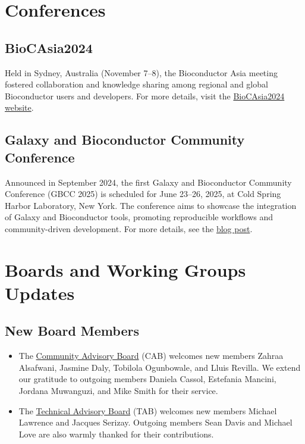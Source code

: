 \hypertarget{conferences}{%
\section{Conferences}\label{conferences}}

\hypertarget{biocasia2024}{%
\subsection{BioCAsia2024}\label{biocasia2024}}

Held in Sydney, Australia (November 7--8), the Bioconductor Asia meeting fostered collaboration and knowledge sharing among regional and global Bioconductor users and developers. For more details, visit the \href{https://biocasia2024.bioconductor.org/}{BioCAsia2024 website}.

\hypertarget{galaxy-and-bioconductor-community-conference}{%
\subsection{Galaxy and Bioconductor Community Conference}\label{galaxy-and-bioconductor-community-conference}}

Announced in September 2024, the first Galaxy and Bioconductor Community Conference (GBCC 2025) is scheduled for June 23--26, 2025, at Cold Spring Harbor Laboratory, New York. The conference aims to showcase the integration of Galaxy and Bioconductor tools, promoting reproducible workflows and community-driven development. For more details, see the \href{https://blog.bioconductor.org/posts/2024-09-03-gbcc2025-announcement/}{blog post}.

\hypertarget{boards-and-working-groups-updates}{%
\section{Boards and Working Groups Updates}\label{boards-and-working-groups-updates}}

\hypertarget{new-board-members}{%
\subsection{New Board Members}\label{new-board-members}}

\begin{itemize}
\item
  The \href{https://bioconductor.org/about/community-advisory-board/}{Community Advisory Board} (CAB) welcomes new members Zahraa Alsafwani, Jasmine Daly, Tobilola Ogunbowale, and Lluis Revilla. We extend our gratitude to outgoing members Daniela Cassol, Estefania Mancini, Jordana Muwanguzi, and Mike Smith for their service.
\item
  The \href{https://bioconductor.org/about/technical-advisory-board/}{Technical Advisory Board} (TAB) welcomes new members Michael Lawrence and Jacques Serizay. Outgoing members Sean Davis and Michael Love are also warmly thanked for their contributions.
\end{itemize}

